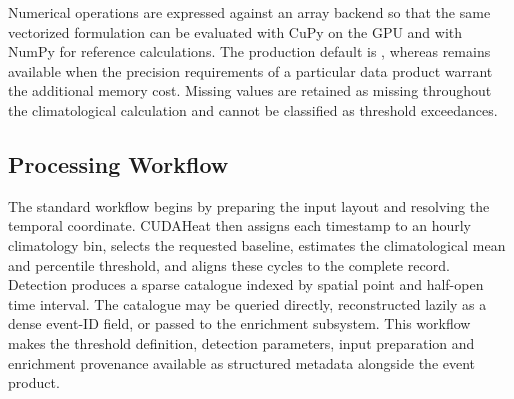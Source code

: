 Numerical operations are expressed against an array backend so that the same vectorized formulation can be evaluated with CuPy on the GPU and with NumPy for reference calculations. The production default is , whereas  remains available when the precision requirements of a particular data product warrant the additional memory cost. Missing values are retained as missing throughout the climatological calculation and cannot be classified as threshold exceedances.

\subsection{Processing Workflow}

The standard workflow begins by preparing the input layout and resolving the temporal coordinate. CUDAHeat then assigns each timestamp to an hourly climatology bin, selects the requested baseline, estimates the climatological mean and percentile threshold, and aligns these cycles to the complete record. Detection produces a sparse catalogue indexed by spatial point and half-open time interval. The catalogue may be queried directly, reconstructed lazily as a dense event-ID field, or passed to the enrichment subsystem. This workflow makes the threshold definition, detection parameters, input preparation and enrichment provenance available as structured metadata alongside the event product.
